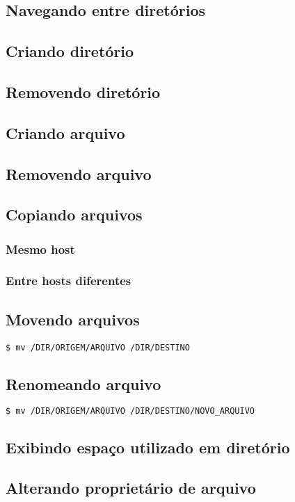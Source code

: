 \documentclass[a4paper,8pt]{extarticle}
\begin{document}
\begin{multicols}{2}
\subsection{Navegando entre diretórios}
\subsection{Criando diretório}
\subsection{Removendo diretório}
\subsection{Criando arquivo}
\subsection{Removendo arquivo}
\subsection{Copiando arquivos}
\subsubsection{Mesmo host}
\subsubsection{Entre hosts diferentes}
\subsection{Movendo arquivos} 
	

   \texttt{\$ mv /DIR/ORIGEM/ARQUIVO /DIR/DESTINO}

\subsection{Renomeando arquivo}

\begin{lstlisting}[language=bash]
  $ mv /DIR/ORIGEM/ARQUIVO /DIR/DESTINO/NOVO_ARQUIVO
\end{lstlisting}

\subsection{Exibindo espaço utilizado em diretório}
\subsection{Alterando proprietário de arquivo}

\end{multicols}
\end{document}
